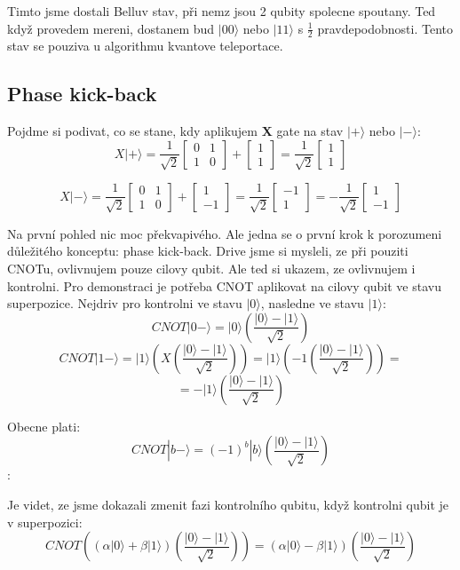 \documentclass[12pt]{article}
\begin{document}
\par Timto jsme dostali Belluv stav, při nemz jsou 2 qubity spolecne spoutany.
Ted když provedem mereni, dostanem bud $|00\rangle$ nebo $|11\rangle$ s $\frac{1}{2}$ pravdepodobnosti.
Tento stav se pouziva u algorithmu kvantove teleportace.

\subsection{Phase kick-back}
Pojdme si podivat, co se stane, kdy aplikujem \textbf{X} gate na stav $|+\rangle$ nebo $|-\rangle$:
$$X|+\rangle = \frac{1}{\sqrt{2}}\begin{bmatrix}
        0 & 1 \\
        1 & 0
    \end{bmatrix} + \begin{bmatrix}
        1 \\
        1
    \end{bmatrix} = \frac{1}{\sqrt{2}} \begin{bmatrix}
        1 \\
        1
    \end{bmatrix} $$

$$X|-\rangle = \frac{1}{\sqrt{2}}\begin{bmatrix}
        0 & 1 \\
        1 & 0
    \end{bmatrix} + \begin{bmatrix}
        1 \\
        -1
    \end{bmatrix} = \frac{1}{\sqrt{2}} \begin{bmatrix}
        -1 \\
        1
    \end{bmatrix} = -\frac{1}{\sqrt{2}} \begin{bmatrix}
        1 \\
        -1
    \end{bmatrix} $$
\par Na první pohled nic moc překvapivého.
Ale jedna se o první krok k porozumeni důležitého konceptu: phase kick-back.
Drive jsme si mysleli, ze při pouziti CNOTu, ovlivnujem pouze cilovy qubit.
Ale ted si ukazem, ze ovlivnujem i kontrolni.
Pro demonstraci je potřeba CNOT aplikovat na cilovy qubit ve stavu superpozice.
Nejdriv pro kontrolni ve stavu $|0\rangle$, nasledne ve stavu $|1\rangle$:
$$CNOT |0-\rangle = |0\rangle \left(\frac{|0\rangle - |1\rangle}{\sqrt{2}}\right)$$
$$CNOT |1-\rangle = |1\rangle \left(X \left(\frac{|0\rangle - |1\rangle}{\sqrt{2}}\right)\right) = |1\rangle \left(-1\left(\frac{|0\rangle - |1\rangle}{\sqrt{2}}\right)\right) =$$
$$= -|1\rangle \left(\frac{|0\rangle - |1\rangle}{\sqrt{2}}\right)$$
\par Obecne plati:
$$CNOT |b-\rangle = (-1)^b|b\rangle\left(\frac{|0\rangle - |1\rangle}{\sqrt{2}}\right)$$:
\par Je videt, ze jsme dokazali zmenit fazi kontrolního qubitu, když kontrolni qubit je v superpozici:
$$CNOT\left((\alpha|0\rangle + \beta|1\rangle)\left(\frac{|0\rangle - |1\rangle}{\sqrt{2}}\right)\right) = (\alpha|0\rangle - \beta|1\rangle)\left(\frac{|0\rangle - |1\rangle}{\sqrt{2}}\right)$$
\newpage
\end{document}
